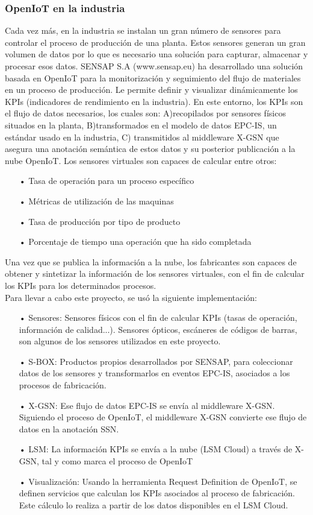 \documentclass[12pt, twoside]{book}
\begin{document}
\subsubsection{OpenIoT en la industria}
Cada vez más, en la industria se instalan un gran número de sensores para controlar el proceso de producción de una planta. Estos sensores generan un gran volumen de datos por lo que es necesario una solución para capturar, almacenar y procesar esos datos. SENSAP S.A (www.sensap.eu) ha desarrollado una solución basada en OpenIoT para la monitorización y seguimiento del flujo de materiales en un proceso de producción. Le permite definir y visualizar dinámicamente los KPIs (indicadores de rendimiento en la industria). En este entorno, los KPIs son el flujo de datos necesarios, los cuales son: A)recopilados por sensores físicos situados en la planta, B)transformados en el modelo de datos EPC-IS, un estándar usado en la industria, C) transmitidos al middleware X-GSN que asegura una anotación semántica de estos datos y su posterior publicación a la nube OpenIoT. Los sensores virtuales son capaces de calcular entre otros: \\
\begin{itemize}
\item[•] Tasa de operación para un proceso específico
\item[•] Métricas de utilización de las maquinas
\item[•] Tasa de producción por tipo de producto
\item[•] Porcentaje de tiempo una operación que ha sido completada
\end{itemize} 

Una vez que se publica la información a la nube, los fabricantes son capaces de obtener y sintetizar la información de los sensores virtuales, con el fin de calcular los KPIs para los determinados procesos.\\

Para llevar a cabo este proyecto, se usó la siguiente implementación:\\
\begin{itemize}
\item[•] Sensores: Sensores físicos con el fin de calcular KPIs (tasas de operación, información de calidad...). Sensores ópticos, escáneres de códigos de barras, son algunos de los sensores utilizados en este proyecto.
\item[•] S-BOX: Productos propios desarrollados por SENSAP, para coleccionar datos de los sensores y transformarlos en eventos EPC-IS, asociados a los procesos de fabricación.
\item[•] X-GSN: Ese flujo de datos EPC-IS se envía al middleware X-GSN. Siguiendo el proceso de OpenIoT, el middleware X-GSN convierte ese flujo de datos en la anotación SSN.
\item[•] LSM: La información KPIs se envía a la nube (LSM Cloud) a través de X-GSN, tal y como marca el proceso de OpenIoT
\item[•] Visualización: Usando la herramienta Request Definition de OpenIoT, se definen servicios que calculan los KPIs asociados al proceso de fabricación. Este cálculo lo realiza a partir de los datos disponibles en el LSM Cloud. 
\end{itemize}
\end{document}
